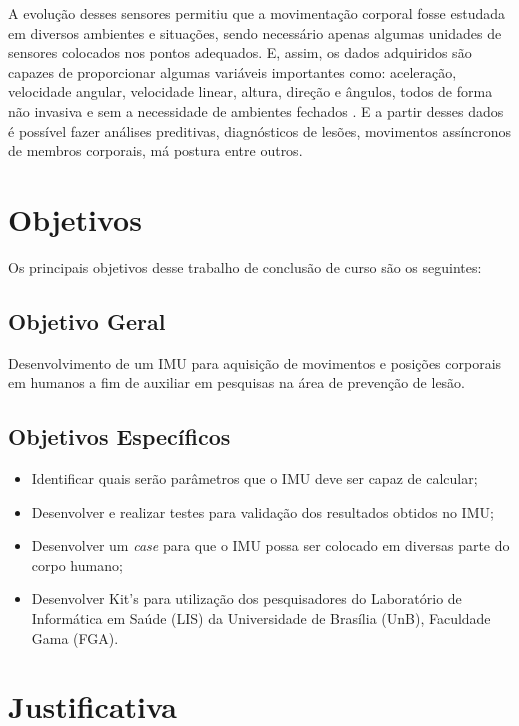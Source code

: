 A evolução desses sensores permitiu que a movimentação corporal fosse estudada em diversos ambientes e situações, sendo necessário apenas algumas unidades de sensores colocados nos pontos adequados. E, assim, os dados adquiridos são capazes de proporcionar algumas variáveis importantes como: aceleração, velocidade angular, velocidade linear, altura, direção e ângulos, todos de forma não invasiva e sem a necessidade de ambientes fechados \cite{chang2016}. E a partir desses dados é possível fazer análises preditivas, diagnósticos de lesões, movimentos assíncronos de membros corporais, má postura entre outros.



\section{Objetivos}

Os principais objetivos desse trabalho de conclusão de curso são os seguintes:

\subsection{Objetivo Geral}

Desenvolvimento de um IMU para aquisição de movimentos e posições corporais em humanos a fim de auxiliar em pesquisas na área de prevenção de lesão.

\subsection {Objetivos Específicos} 
 \begin{itemize} 
		\item Identificar quais serão parâmetros que o IMU deve ser capaz de calcular;
		
		\item Desenvolver e realizar testes para validação dos resultados obtidos no IMU;
		
		\item Desenvolver um \textit{case} para que o IMU possa ser colocado em diversas parte do corpo humano;
		
		\item Desenvolver Kit's para utilização dos pesquisadores do Laboratório de Informática em Saúde (LIS) da Universidade de Brasília (UnB), Faculdade Gama (FGA).
		
		
	\end{itemize}
\section{Justificativa}

